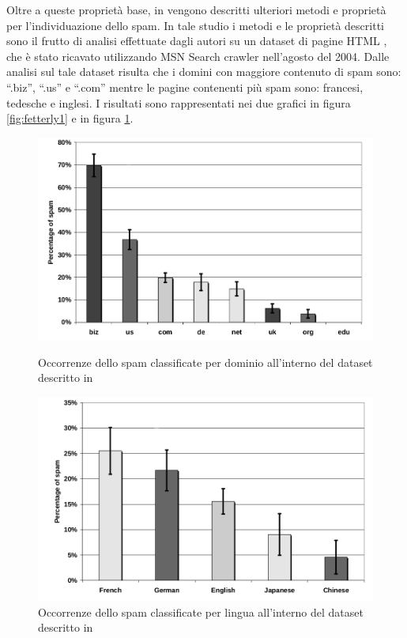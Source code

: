 Oltre a queste proprietà base, in \cite{Ntoulas:2006:DSW:1135777.1135794} vengono descritti ulteriori metodi e proprietà per l'individuazione dello spam. In tale studio i metodi e le proprietà descritti  sono il frutto di analisi effettuate dagli autori su un dataset di pagine HTML , che è stato ricavato utilizzando MSN Search crawler nell'agosto del 2004. Dalle analisi sul tale dataset risulta che i domini con maggiore contenuto di spam sono: ``.biz'', ``.us'' e ``.com'' mentre le pagine contenenti più spam sono: francesi, tedesche e inglesi. I risultati sono rappresentati nei due grafici in figura \ref{fig:fetterly1} e in figura \ref{fig:fetterly2}.
\begin{figure}[htbp]
\centering
\includegraphics[width=12cm]{immagini/fetterly/fetterly1}
\caption{Occorrenze dello spam classificate per dominio all'interno del dataset descritto in \cite{Ntoulas:2006:DSW:1135777.1135794}}
\label{fig:fetterly1}
\includegraphics[width=12cm]{immagini/fetterly/fetterly2}
\caption{Occorrenze dello spam classificate per lingua all'interno del dataset descritto in \cite{Ntoulas:2006:DSW:1135777.1135794}}
\label{fig:fetterly2}
\end{figure}

